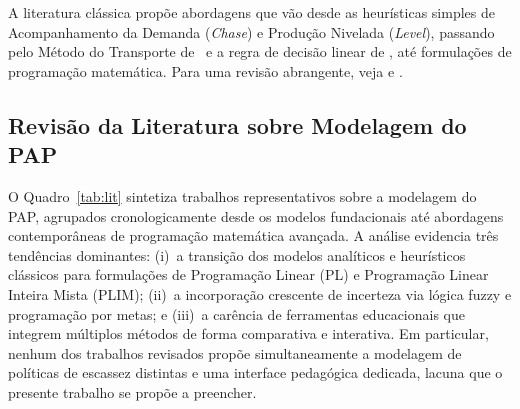 \documentclass[a4paper,11pt]{article}
\begin{document}
A literatura clássica propõe abordagens que vão desde as heurísticas simples de
Acompanhamento da Demanda (\textit{Chase}) e Produção Nivelada (\textit{Level}), passando
pelo Método do Transporte de~\citet{bowman1956} e a regra de decisão linear de
\citet{holt1955}, até formulações de programação matemática. Para uma revisão abrangente,
veja \citet{arenales2015} e \citet{krajewski2013}.

\subsection{Revisão da Literatura sobre Modelagem do PAP}

O Quadro~\ref{tab:lit} sintetiza trabalhos representativos sobre a modelagem do PAP,
agrupados cronologicamente desde os modelos fundacionais até abordagens contemporâneas de
programação matemática avançada. A análise evidencia três tendências dominantes:
(i)~a transição dos modelos analíticos e heurísticos clássicos para formulações de
Programação Linear (PL) e Programação Linear Inteira Mista (PLIM); (ii)~a incorporação
crescente de incerteza via lógica fuzzy e programação por metas; e (iii)~a carência de
ferramentas educacionais que integrem múltiplos métodos de forma comparativa e interativa.
Em particular, nenhum dos trabalhos revisados propõe simultaneamente a modelagem de
políticas de escassez distintas e uma interface pedagógica dedicada, lacuna que o presente
trabalho se propõe a preencher.
\end{document}

